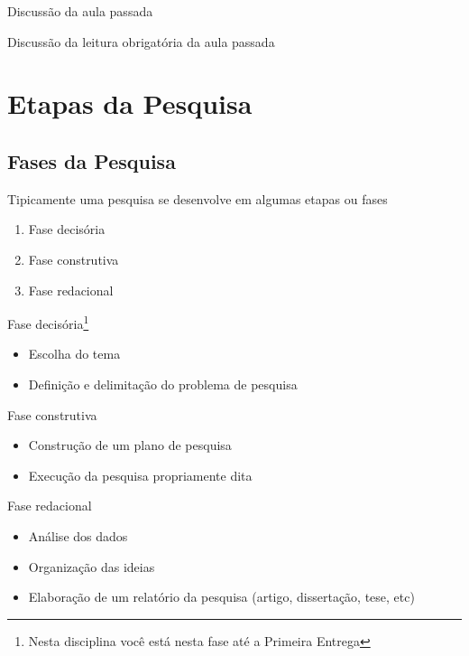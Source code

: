 \documentclass{beamer}
\begin{document}

\begin{frame}{Discussão da aula passada}
  \begin{block}{}
    Discussão da leitura obrigatória da aula passada
  \end{block}
\end{frame}

\section{Etapas da Pesquisa}

\subsection{Fases da Pesquisa}

\begin{frame}
  Tipicamente uma pesquisa se desenvolve em algumas etapas ou fases
  \begin{enumerate}
  \item Fase decisória
  \item Fase construtiva
  \item Fase redacional
  \end{enumerate}
\end{frame}

\begin{frame}{Fase decisória\footnote{Nesta disciplina você está nesta fase até a Primeira Entrega}}
  \begin{itemize}
  \item Escolha do tema
  \item Definição e delimitação do problema de pesquisa
  \end{itemize}
\end{frame}

\begin{frame}{Fase construtiva}
  \begin{itemize}
  \item Construção de um plano de pesquisa
  \item Execução da pesquisa propriamente dita
  \end{itemize}
\end{frame}

\begin{frame}{Fase redacional}
  \begin{itemize}
  \item Análise dos dados
  \item Organização das ideias
  \item Elaboração de um relatório da pesquisa (artigo, dissertação,
    tese, etc)
  \end{itemize}
\end{frame}
\end{document}
